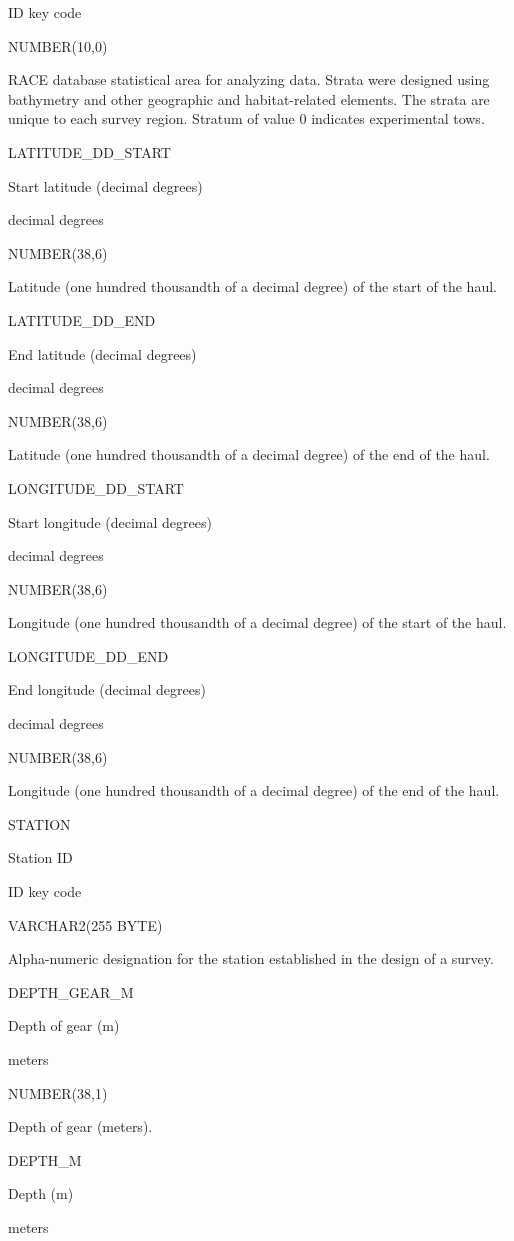 \documentclass[
  letterpaper,
  oneside,
  open=any]{scrbook}
\begin{document}
ID key code

NUMBER(10,0)

RACE database statistical area for analyzing data. Strata were designed
using bathymetry and other geographic and habitat-related elements. The
strata are unique to each survey region. Stratum of value 0 indicates
experimental tows.

LATITUDE\_DD\_START

Start latitude (decimal degrees)

decimal degrees

NUMBER(38,6)

Latitude (one hundred thousandth of a decimal degree) of the start of
the haul.

LATITUDE\_DD\_END

End latitude (decimal degrees)

decimal degrees

NUMBER(38,6)

Latitude (one hundred thousandth of a decimal degree) of the end of the
haul.

LONGITUDE\_DD\_START

Start longitude (decimal degrees)

decimal degrees

NUMBER(38,6)

Longitude (one hundred thousandth of a decimal degree) of the start of
the haul.

LONGITUDE\_DD\_END

End longitude (decimal degrees)

decimal degrees

NUMBER(38,6)

Longitude (one hundred thousandth of a decimal degree) of the end of the
haul.

STATION

Station ID

ID key code

VARCHAR2(255 BYTE)

Alpha-numeric designation for the station established in the design of a
survey.

DEPTH\_GEAR\_M

Depth of gear (m)

meters

NUMBER(38,1)

Depth of gear (meters).

DEPTH\_M

Depth (m)

meters
\end{document}
